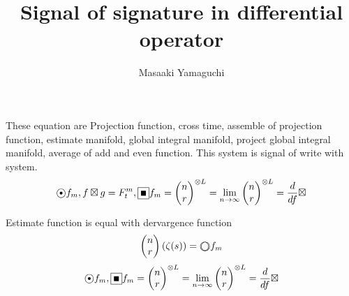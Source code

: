 \documentclass{jsarticle}
\begin{document}
\title{Signal of signature in differential operator}
\author{Masaaki Yamaguchi}
\date{}
\maketitle
  \newcommand{\whitewithbodercircle}
  {\text{\textcircled{\phantom{\textbullet}}}
  \kern-0.9em\text{\textcircled{\phantom{}}}}
     
  
  \newcommand{\whitewithblack}{\text{\textcircled{\textbullet}}}
  \newcommand{\whitewithblacksquare}{\text{\fbox{\text{\rule{0.5em}
  {0.5em}}}}}
  \newcommand{\whitewithwhitesquare}{\text{\fbox{\text{\phantom
  {\rule{0.5em}{0.5em}}}}}}

 These equation are Projection function, cross time, assemble of projection
 function, estimate manifold, global integral manifold, project global 
 integral manifold, average of add and even function.
 This system is signal of write with system.
  $$ \whitewithblack f_m , f \boxtimes g = F^{m}_t, 
  \whitewithblacksquare f_m = {\begin{pmatrix}
	  n \\
  r \end{pmatrix}}^{\otimes L} = \lim_{n \to \infty}
  {\begin{pmatrix}
	  n \\
  r \end{pmatrix}}^{\otimes L} = {d \over {d f}}\boxtimes $$

  \newcommand{\whitewithwhitecircle}
  {\text{\textcircled{\phantom{\textbullet}}}}
  Estimate function is equal with dervargence function
  $$ \begin{pmatrix}
	  n \\
  r \end{pmatrix}(\zeta(s)) = \whitewithbodercircle f_m $$
  $$ \whitewithblack f_m ,
  \whitewithblacksquare f_m = {\begin{pmatrix}
	  n \\
  r \end{pmatrix}}^{\otimes L} = \lim_{n \to \infty}
  {\begin{pmatrix}
	  n \\
  r \end{pmatrix}}^{\otimes L} = {d \over {d f}}\boxtimes $$


   \newcommand{\variint}{%
	\begin{picture}(15,30)
		\put(0,0){
			$ \iint $}
		\put(0,5){\line(15,0){15}}
	\end{picture} %
}
   \newcommand{\variiint}{%
	\begin{picture}(15,30)
		\put(0,0){
			$ \iiint $}
		\put(0,5){\line(15,0){15}}
	\end{picture} %
}
\end{document}
